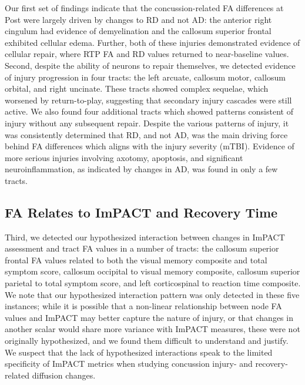 \documentclass[12pt]{article}
\begin{document}
Our first set of findings indicate that the concussion-related FA differences at Post were largely driven by changes to RD and not AD: the anterior right cingulum had evidence of demyelination and the callosum superior frontal exhibited cellular edema. Further, both of these injuries demonstrated evidence of cellular repair, where RTP FA and RD values returned to near-baseline values. Second, despite the ability of neurons to repair themselves, we detected evidence of injury progression in four tracts: the left arcuate, callosum motor, callosum orbital, and right uncinate. These tracts showed complex sequelae, which worsened by return-to-play, suggesting that secondary injury cascades were still active. We also found four additional tracts which showed patterns consistent of injury without any subsequent repair. Despite the various patterns of injury, it was consistently determined that RD, and not AD, was the main driving force behind FA differences which aligns with the injury severity (mTBI). Evidence of more serious injuries involving axotomy, apoptosis, and significant neuroinflammation, as indicated by changes in AD, was found in only a few tracts.


\subsection{FA Relates to ImPACT and Recovery Time}
\label{ssec:disc-impact}
Third, we detected our hypothesized interaction between changes in ImPACT assessment and tract FA values in a number of tracts: the callosum superior frontal FA values related to both the visual memory composite and total symptom score, callosum occipital to visual memory composite, callosum superior parietal to total symptom score, and left corticospinal to reaction time composite. We note that our hypothesized interaction pattern was only detected in these five instances; while it is possible that a non-linear relationship between node FA values and ImPACT may better capture the nature of injury, or that changes in another scalar would share more variance with ImPACT measures, these were not originally hypothesized, and we found them difficult to understand and justify. We suspect that the lack of hypothesized interactions speak to the limited specificity of ImPACT metrics \parencite{schatz2013SensitivitySpecificityOnline} when studying concussion injury- and recovery-related diffusion changes.
\end{document}
